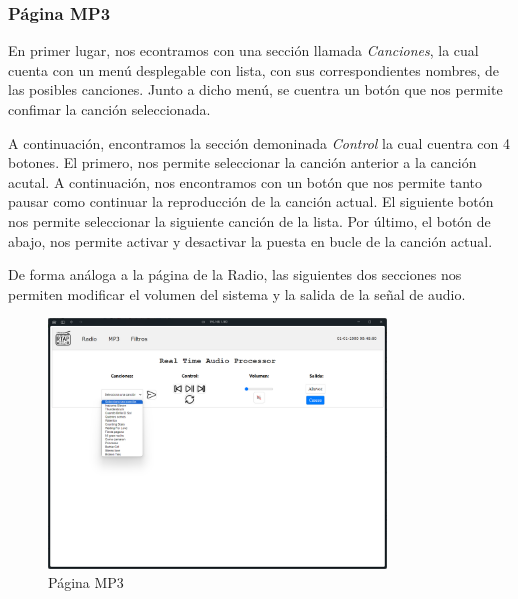 \subsubsection{Página MP3}
En primer lugar, nos econtramos con una sección llamada \textit{Canciones}, la cual cuenta con un menú desplegable con lista, con sus correspondientes nombres, de las posibles canciones. Junto a dicho menú, se cuentra un botón que nos permite confimar la canción seleccionada.

A continuación, encontramos la sección demoninada \textit{Control} la cual cuentra con 4 botones. El primero, nos permite seleccionar la canción anterior a la canción acutal. A continuación, nos encontramos con un botón que nos permite tanto pausar como continuar la reproducción de la canción actual. El siguiente botón nos permite seleccionar la siguiente canción de la lista. Por último, el botón de abajo, nos permite activar y desactivar la puesta en bucle de la canción actual.

De forma análoga a la página de la Radio, las siguientes dos secciones nos permiten modificar el volumen del sistema y la salida de la señal de audio.

\begin{figure}[H]
    \centering
    \includegraphics[width=0.8\textwidth]{images/3/3-1/3-1-1-3/Pagina_MP3.png}
    \caption{Página MP3}
    \label{fig:3-1-1-3-MP3}
\end{figure}